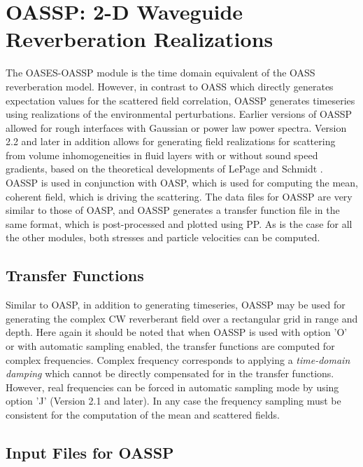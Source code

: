 \section{OASSP: 2-D Waveguide Reverberation Realizations}

    The OASES-OASSP module is the time domain equivalent of the OASS
reverberation model. However, in contrast to OASS which directly
generates expectation values for the scattered field correlation,
OASSP generates timeseries using realizations of the environmental
perturbations. Earlier versions of OASSP allowed for rough interfaces
with Gaussian or power law power spectra. Version 2.2 and later in
addition allows for generating field realizations for scattering from
volume inhomogeneities in fluid layers with or without sound speed
gradients, based on the theoretical developments of LePage and Schmidt
\cite{Lepage_99}. OASSP is used in conjunction with OASP, which is
used for computing the mean, coherent field, which is driving the
scattering. The data files for OASSP are very similar to those of
OASP, and OASSP generates a transfer function file in the same format,
which is post-processed and plotted using PP.  As is the case for all
the other modules, both stresses and particle velocities can be
computed.

\subsection{Transfer Functions}

Similar to OASP, in addition to generating timeseries,
OASSP may be used for generating the complex CW reverberant field over a
rectangular grid in range and depth. Here again it should be noted
that when OASSP is used with option 'O' or with automatic
sampling enabled, the transfer functions are computed for complex
frequencies. Complex frequency corresponds to applying a {\em
time-domain damping} which cannot be directly compensated for in the
transfer functions. However, real frequencies can be forced in
automatic sampling mode by using option 'J' (Version 2.1 and
later). In any case the frequency sampling must be consistent for the
computation of the mean and scattered fields.

\subsection{Input Files for OASSP}

